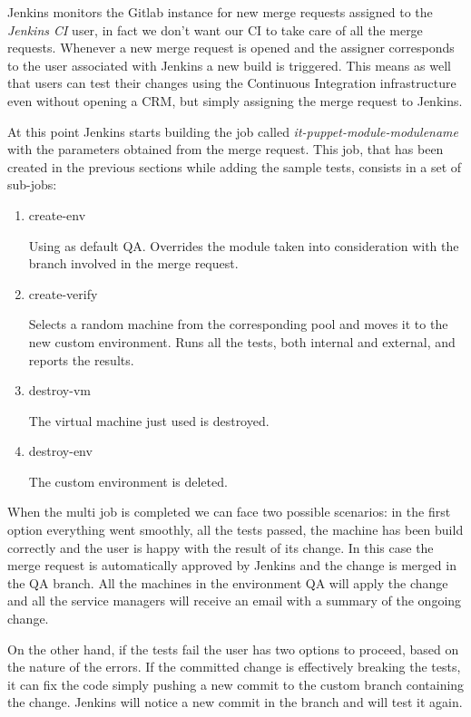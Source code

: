 Jenkins monitors the Gitlab instance for new merge requests assigned to
the \textit{Jenkins CI} user, in fact we don't want our CI to take care of
all the merge requests. Whenever a new merge request is opened and the
assigner corresponds to the user associated with Jenkins a new build is
triggered. This means as well that users can test their changes using the
Continuous Integration infrastructure even without opening a CRM, but
simply assigning the merge request to Jenkins.

At this point Jenkins starts building the job called
\textit{it-puppet-module-modulename} with the parameters obtained from the
merge request. This job, that has been created in the previous sections
while adding the sample tests, consists in a set of sub-jobs:

\begin{enumerate}

  \item create-env

  Using as default QA. Overrides the module taken into consideration with
  the branch involved in the merge request.

  \item create-verify

  Selects a random machine from the corresponding pool and moves it to the
  new custom environment. Runs all the tests, both internal and external,
  and reports the results.

  \item destroy-vm

  The virtual machine just used is destroyed.

  \item destroy-env

  The custom environment is deleted.

\end{enumerate}

When the multi job is completed we can face two possible scenarios: in the
first option everything went smoothly, all the tests passed, the machine
has been build correctly and the user is happy with the result of its
change. In this case the merge request is automatically approved by
Jenkins and the change is merged in the QA branch. All the machines in the
environment QA will apply the change and all the service managers will
receive an email with a summary of the ongoing change.

On the other hand, if the tests fail the user has two options to proceed,
based on the nature of the errors. If the committed change is effectively
breaking the tests, it can fix the code simply pushing a new commit to the
custom branch containing the change. Jenkins will notice a new commit in
the branch and will test it again.

